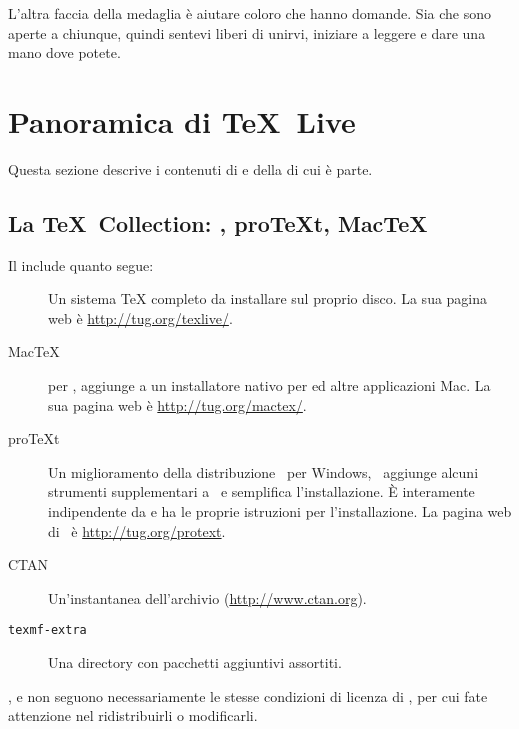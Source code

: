 \documentclass{article}
\begin{document}
L'altra faccia della medaglia è aiutare coloro che hanno domande. Sia
 che  sono aperte a chiunque, quindi
sentevi liberi di unirvi, iniziare a leggere e dare una mano dove potete.

\section{Panoramica di \protect\TeX\protect\ Live}
\label{sec:overview-tl}

Questa sezione descrive i contenuti di \TL{} e della \TK{} di cui è parte.

\subsection{La \protect\TeX\protect\ Collection: \TL, pro\TeX{}t, Mac\TeX}
\label{sec:tl-coll-dists}

Il \DVD{} \TK{} include quanto segue:

\begin{description}

\item [\TL] Un sistema \TeX{} completo da installare sul proprio disco. La sua
  pagina web è \url{http://tug.org/texlive/}.

\item [Mac\TeX] per \MacOSX, aggiunge a \TL{} un installatore nativo per \MacOSX
  ed altre applicazioni Mac. La sua pagina web è \url{http://tug.org/mactex/}.

\item [pro\TeX{}t] Un miglioramento della distribuzione \MIKTEX\ per
  Windows, \ProTeXt\ aggiunge alcuni strumenti supplementari a \MIKTEX\ e
  semplifica l'installazione. È interamente indipendente da \TL{} e ha le
  proprie istruzioni per l'installazione. La pagina web di \ProTeXt\ è
  \url{http://tug.org/protext}.  

\item [CTAN] Un'instantanea dell'archivio \CTAN{}
  (\url{http://www.ctan.org}).

\item [\texttt{texmf-extra}] Una directory con pacchetti aggiuntivi
  assortiti.

\end{description}

\CTAN{},  e  non seguono
necessariamente le stesse condizioni di licenza di \TL{}, per cui fate
attenzione nel ridistribuirli o modificarli.
\end{document}
